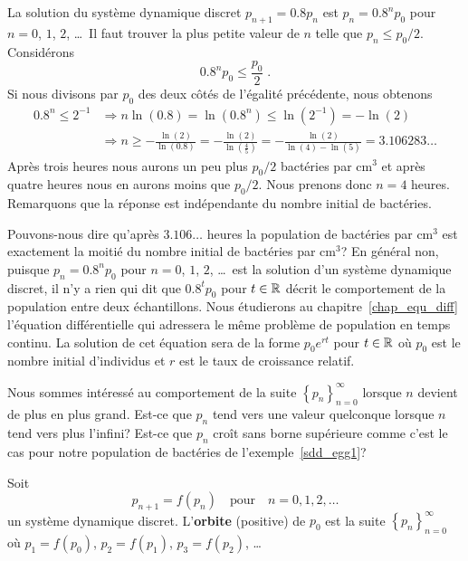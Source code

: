 {\begin{egg}
La solution du système dynamique discret $p_{n+1} = 0.8 p_n$ est
$p_n = 0.8^n p_0$ pour $n=0$, $1$, $2$, \ldots\  Il faut trouver la plus
petite valeur de $n$ telle que $p_n \leq p_0/2$.  Considérons
\[
 0.8^n p_0 \leq \frac{p_0}{2}  \; .
\]
Si nous divisons par $p_0$ des deux côtés de l'égalité précédente, nous
obtenons
\begin{align*}
  0.8^n \leq 2^{-1} &\Rightarrow n \ln(0.8) = \ln(0.8^n) \leq \ln(2^{-1})
= - \ln(2) \\
&\Rightarrow n \geq -\frac{\ln(2)}{\ln(0.8)} =
-\frac{\ln(2)}{\ln\left(\frac{4}{5}\right)} =
-\frac{\ln(2)}{\ln(4)-\ln(5)} = 3.106283\ldots
\end{align*}
Après trois heures nous aurons un peu plus $p_0/2$ bactéries par cm$^3$ et
après quatre heures nous en aurons moins que $p_0/2$.  Nous prenons
donc $n=4$ heures.  Remarquons que la réponse est indépendante du
nombre initial de bactéries.

Pouvons-nous dire qu'après $3.106\ldots$ heures la population de bactéries
par cm$^3$ est exactement la moitié du nombre initial de bactéries
par cm$^3$?  En général non, puisque $p_n = 0.8^n p_0$ pour $n=0$,
$1$, $2$, \ldots\ est la solution d'un système dynamique discret, il
n'y a rien qui dit que $0.8^t p_0$ pour $t\in \mathbb{R}$ décrit le
comportement de la population entre deux échantillons.  Nous étudierons
au chapitre~\ref{chap_equ_diff} l'équation différentielle qui
adressera le même problème de population en temps continu. 
La solution de cet équation sera de la forme $p_0 e^{rt}$
pour $t\in \mathbb{R}$ où $p_0$ est le nombre initial d'individus et $r$ est
le taux de croissance relatif.
\end{egg}

Nous sommes intéressé au comportement de la suite
$\displaystyle \left\{p_n\right\}_{n=0}^\infty$ lorsque $n$ devient de
plus en plus grand.  Est-ce que $p_n$ tend vers une valeur quelconque
lorsque $n$ tend vers plus l'infini?  Est-ce que $p_n$ croît sans
borne supérieure comme c'est le cas pour notre population de bactéries
de l'exemple~\ref{sdd_egg1}?

\begin{defn} 
Soit
\[
p_{n+1}= f(p_n) \quad \text{pour} \quad n=0, 1, 2, \ldots
\]
un système dynamique discret.  L'{\bfseries orbite} (positive) de
$p_0$ est la suite $\displaystyle \left\{ p_n \right\}_{n=0}^\infty$
où $p_1 = f(p_0)$, $p_2 = f(p_1)$, $p_3 = f(p_2)$, \ldots
\end{defn}

}
